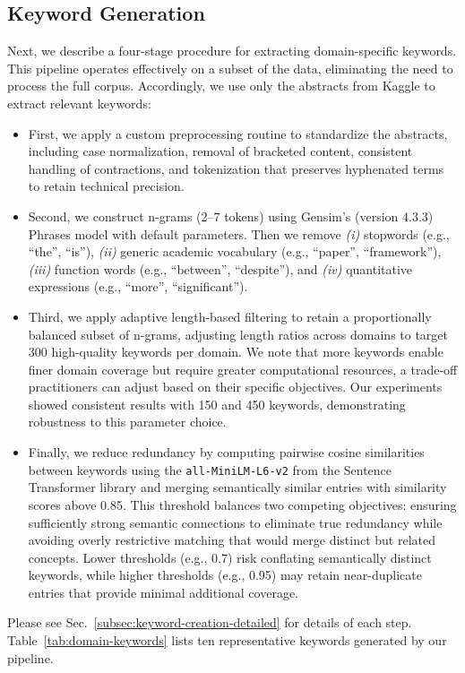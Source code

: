 \documentclass[10pt]{article}
\begin{document}
\subsection{Keyword Generation} \vspace*{-.15cm}
\label{subsec:keyword-creation}
Next, we describe a four-stage procedure for extracting domain-specific keywords. This pipeline operates effectively on a subset of the data, eliminating the need to process the full corpus. Accordingly, we use only the abstracts from Kaggle to extract relevant keywords: \vspace*{-.15cm}
\begin{itemize}
    \item First, we apply a custom preprocessing routine to standardize the abstracts, including case normalization, removal of bracketed content, consistent handling of contractions, and tokenization that preserves hyphenated terms to retain technical precision.
    \item Second, we construct n-grams (2–7 tokens) using Gensim's (version 4.3.3) Phrases model \citep{vrehuuvrek2010software, mikolov2013distributed} with default parameters. Then we remove \textit{(i)} stopwords (e.g., ``the'', ``is''), \textit{(ii)} generic academic vocabulary (e.g., ``paper'', ``framework''), \textit{(iii)} function words (e.g., ``between'', ``despite''), and \textit{(iv)} quantitative expressions (e.g., ``more'', ``significant'').
    \item Third, we apply adaptive length-based filtering to retain a proportionally balanced subset of n-grams, adjusting length ratios across domains to target 300 high-quality keywords per domain. We note that more keywords enable finer domain coverage but require greater computational resources, a trade-off practitioners can adjust based on their specific objectives. Our experiments showed consistent results with 150 and 450 keywords, demonstrating robustness to this parameter choice.
    \item Finally, we reduce redundancy by computing pairwise cosine similarities between keywords using the \texttt{all-MiniLM-L6-v2} \citep{wang2020minilm} from the Sentence Transformer library \citep{reimers2019sentence} and merging semantically similar entries with similarity scores above 0.85. This threshold balances two competing objectives: ensuring sufficiently strong semantic connections to eliminate true redundancy while avoiding overly restrictive matching that would merge distinct but related concepts. Lower thresholds (e.g., 0.7) risk conflating semantically distinct keywords, while higher thresholds (e.g., 0.95) may retain near-duplicate entries that provide minimal additional coverage.
\end{itemize}
Please see Sec.~\ref{subsec:keyword-creation-detailed} for details of each step. Table~\ref{tab:domain-keywords} lists ten representative keywords generated by our pipeline.
\end{document}
